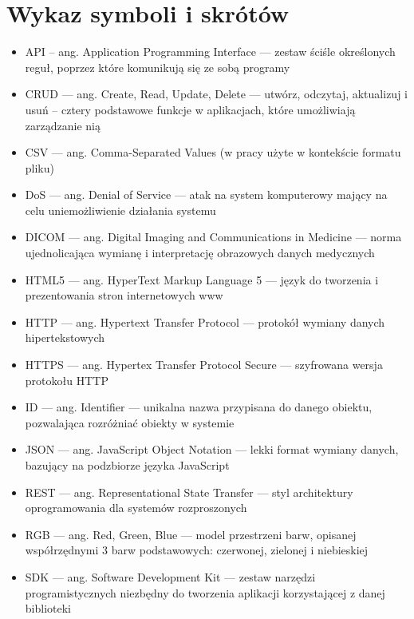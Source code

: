 \documentclass[a4paper,11pt,twoside,openright]{report}
\newcommand\blankpage{%
    \null
    \thispagestyle{empty}%
    \newpage}
\theoremstyle{definition}
\begin{document}
\afterpage{\blankpage}
\chapter*{Wykaz symboli i skrótów}


\begin{itemize}[noitemsep]
\item API -- ang. Application Programming Interface --- zestaw ściśle określonych reguł, poprzez które komunikują się ze sobą programy\\
\item CRUD --- ang. Create, Read, Update, Delete --- utwórz, odczytaj, aktualizuj i usuń -- cztery podstawowe funkcje w aplikacjach, które umożliwiają zarządzanie nią\\
\item CSV --- ang. Comma-Separated Values (w pracy użyte w kontekście formatu pliku) \\
\item DoS --- ang. Denial of Service --- atak na system komputerowy mający na celu uniemożliwienie działania systemu\\
\item DICOM --- ang. Digital Imaging and Communications in Medicine --- norma ujednolicająca wymianę i interpretację obrazowych danych medycznych\\
\item HTML5 --- ang. HyperText Markup Language 5 --- język do tworzenia i prezentowania stron internetowych www\\
\item HTTP --- ang. Hypertext Transfer Protocol --- protokół wymiany danych hipertekstowych\\
\item HTTPS --- ang. Hypertex Transfer Protocol Secure --- szyfrowana wersja protokołu HTTP\\
\item ID --- ang. Identifier --- unikalna nazwa przypisana do danego obiektu, pozwalająca rozróżniać obiekty w systemie\\
\item JSON --- ang. JavaScript Object Notation --- lekki format wymiany danych, bazujący na podzbiorze języka JavaScript\\
\item REST --- ang. Representational State Transfer --- styl architektury oprogramowania dla systemów rozproszonych\\
\item RGB --- ang. Red, Green, Blue --- model przestrzeni barw, opisanej współrzędnymi 3 barw podstawowych: czerwonej, zielonej i niebieskiej\\
\item SDK --- ang. Software Development Kit --- zestaw narzędzi programistycznych niezbędny do tworzenia aplikacji korzystającej z danej biblioteki\\
\end{itemize}
\end{document}
